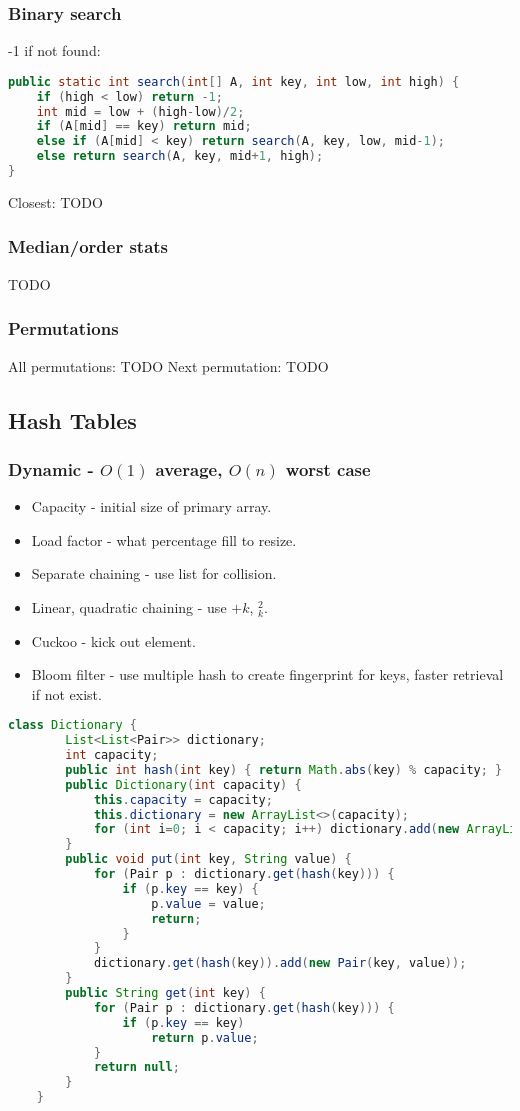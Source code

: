\documentclass{article}
\begin{document}
\subsubsection{Binary search}
-1 if not found:
\begin{lstlisting}[language=java]
public static int search(int[] A, int key, int low, int high) {
    if (high < low) return -1;
    int mid = low + (high-low)/2;
    if (A[mid] == key) return mid;
    else if (A[mid] < key) return search(A, key, low, mid-1);
    else return search(A, key, mid+1, high);
}
\end{lstlisting}
Closest: TODO

\subsubsection{Median/order stats}
TODO

\subsubsection{Permutations}
All permutations: TODO
Next permutation: TODO

\subsection{Hash Tables}
\subsubsection{Dynamic - $O(1)$ average, $O(n)$ worst case}
\begin{itemize}
    \item Capacity - initial size of primary array.
    \item Load factor - what percentage fill to resize.
    \item Separate chaining - use list for collision.
    \item Linear, quadratic chaining - use $+k$, $_k^2$.
    \item Cuckoo - kick out element.
    \item Bloom filter - use multiple hash to create fingerprint for keys, faster retrieval if not exist.
\end{itemize}
\begin{lstlisting}[language=java]
    class Dictionary {
        List<List<Pair>> dictionary;
        int capacity;
        public int hash(int key) { return Math.abs(key) % capacity; }
        public Dictionary(int capacity) {
            this.capacity = capacity;
            this.dictionary = new ArrayList<>(capacity);
            for (int i=0; i < capacity; i++) dictionary.add(new ArrayList<Pair>());
        }
        public void put(int key, String value) {
            for (Pair p : dictionary.get(hash(key))) {
                if (p.key == key) {
                    p.value = value;
                    return;
                }
            }
            dictionary.get(hash(key)).add(new Pair(key, value));
        }
        public String get(int key) {
            for (Pair p : dictionary.get(hash(key))) {
                if (p.key == key)
                    return p.value;
            }
            return null;
        }
    }
\end{lstlisting}
\end{document}
